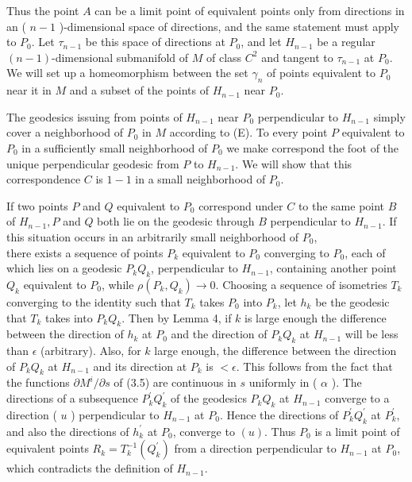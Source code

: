 \documentclass[10pt]{article}
\begin{document}
Thus the point $A$ can be a limit point of equivalent points only from directions in an ( $n-1$ )-dimensional space of directions, and the same statement must apply to $P_{0}$. Let $\tau_{n-1}$ be this space of directions at $P_{0}$, and let $H_{n-1}$ be a regular $(n-1)$-dimensional submanifold of $M$ of class $C^{2}$ and tangent to $\tau_{n-1}$ at $P_{0}$. We will set up a homeomorphism between the set $\gamma_{n}$ of points equivalent to $P_{0}$ near it in $M$ and a subset of the points of $H_{n-1}$ near $P_{0}$.

The geodesics issuing from points of $H_{n-1}$ near $P_{0}$ perpendicular to $H_{n-1}$ simply cover a neighborhood of $P_{0}$ in $M$ according to (E). To every point $P$ equivalent to $P_{0}$ in a sufficiently small neighborhood of $P_{0}$ we make correspond the foot of the unique perpendicular geodesic from $P$ to $H_{n-1}$. We will show that this correspondence $C$ is $1-1$ in a small neighborhood of $P_{0}$.

If two points $P$ and $Q$ equivalent to $P_{0}$ correspond under $C$ to the same point $B$ of $H_{n-1}, P$ and $Q$ both lie on the geodesic through $B$ perpendicular to $H_{n-1}$. If this situation occurs in an arbitrarily small neighborhood of $P_{0}$,\\
there exists a sequence of points $P_{k}$ equivalent to $P_{0}$ converging to $P_{0}$, each of which lies on a geodesic $P_{k} Q_{k}$, perpendicular to $H_{n-1}$, containing another point $Q_{k}$ equivalent to $P_{0}$, while $\rho\left(P_{k}, Q_{k}\right) \rightarrow 0$. Choosing a sequence of isometries $T_{k}$ converging to the identity such that $T_{k}$ takes $P_{0}$ into $P_{k}$, let $h_{k}$ be the geodesic that $T_{k}$ takes into $P_{k} Q_{k}$. Then by Lemma 4, if $k$ is large enough the difference between the direction of $h_{k}$ at $P_{0}$ and the direction of $P_{k} Q_{k}$ at $H_{n-1}$ will be less than $\epsilon$ (arbitrary). Also, for $k$ large enough, the difference between the direction of $P_{k} Q_{k}$ at $H_{n-1}$ and its direction at $P_{k}$ is $<\epsilon$. This follows from the fact that the functions $\partial M^{i} / \partial s$ of (3.5) are continuous in $s$ uniformly in ( $\alpha$ ). The directions of a subsequence $P_{k}^{\prime} Q_{k}^{\prime}$ of the geodesics $P_{k} Q_{k}$ at $H_{n-1}$ converge to a direction ( $u$ ) perpendicular to $H_{n-1}$ at $P_{0}$. Hence the directions of $P_{k}^{\prime} Q_{k}^{\prime}$ at $P_{k}^{\prime}$, and also the directions of $h_{k}^{\prime}$ at $P_{0}$, converge to $(u)$. Thus $P_{0}$ is a limit point of equivalent points $R_{k}=T_{k}^{-1}\left(Q_{k}^{\prime}\right)$ from a direction perpendicular to $H_{n-1}$ at $P_{0}$, which contradicts the definition of $H_{n-1}$.
\end{document}
